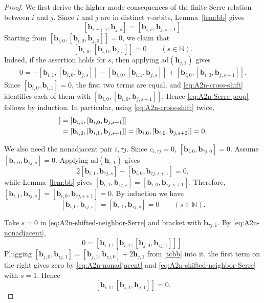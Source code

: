 \documentclass[11pt,reqno]{amsart}
\numberwithin{equation}{section}
\theoremstyle{definition}
\theoremstyle{remark}
\newcommand{\bN}{\mathbb{N}}
\newcommand{\bb}{\mathbf{b}}
\newcommand{\bh}{\mathbf{h}}
\newcommand{\ad}{\mathrm{ad}}
\begin{document}
\begin{proof}
We first derive the higher-mode consequences of the finite Serre relation between $i$ and $j$.
Since $i$ and $j$ are in distinct $\tau$-orbits,
Lemma~\ref{lem:bb} gives
\begin{equation}\label{eq:A2n-cross-shift}
[\bb_{i,r+1},\bb_{j,s}]
=
[\bb_{i,r},\bb_{j,s+1}].
\end{equation}
Starting from $[\bb_{i,0},[\bb_{i,0},\bb_{j,0}]]=0$, we claim that
\begin{equation}\label{eq:A2n-Serre-prop}
[\bb_{i,0},[\bb_{i,0},\bb_{j,s}]]=0
\qquad
(s\in\bN).
\end{equation}
Indeed, if the assertion holds for $s$, then applying
$\ad(\bh_{j,1})$ gives
\begin{align*}
0=
-[\bb_{i,1},[\bb_{i,0},\bb_{j,s}]]
-[\bb_{i,0},[\bb_{i,1},\bb_{j,s}]]+
[\bb_{i,0},[\bb_{i,0},\bb_{j,s+1}]].
\end{align*}
Since $[\bb_{i,0},\bb_{i,1}]=0$, the first two terms are equal, and
\eqref{eq:A2n-cross-shift} identifies each of them with
$[\bb_{i,0},[\bb_{i,0},\bb_{j,s+1}]]$.
Hence \eqref{eq:A2n-Serre-prop} follows by induction.  In particular,
using \eqref{eq:A2n-cross-shift} twice,
\begin{align}
[\bb_{i,1},[\bb_{i,1},\bb_{j,s}]]
&=
[\bb_{i,1},[\bb_{i,0},\bb_{j,s+1}]]
\notag\\
&=
[\bb_{i,0},[\bb_{i,1},\bb_{j,s+1}]]=
[\bb_{i,0},[\bb_{i,0},\bb_{j,s+2}]]
=0.
\label{eq:A2n-shifted-neighbor-Serre}
\end{align}

We also need the nonadjacent pair $i,\tau j$.  Since
$c_{i,\tau j}=0$, $[\bb_{i,0},\bb_{\tau j,0}]=0$. Assume $[\bb_{i,0},\bb_{\tau j,s}]=0$.  Applying
$\ad(\bh_{i,1})$ gives
\begin{equation*}
2[\bb_{i,1},\bb_{\tau j,s}]
-
[\bb_{i,0},\bb_{\tau j,s+1}]
=0,
\end{equation*}
while Lemma~\ref{lem:bb} gives $[\bb_{i,1},\bb_{\tau j,s}]
=
[\bb_{i,0},\bb_{\tau j,s+1}]$. Therefore, $[\bb_{i,1},\bb_{\tau j,s}]
=
[\bb_{i,0},\bb_{\tau j,s+1}]=0$. By induction we have
\begin{equation}\label{eq:A2n-nonadjacent}
[\bb_{i,0},\bb_{\tau j,s}]
=
[\bb_{i,1},\bb_{\tau j,s}]
=0
\qquad
(s\in\bN).
\end{equation}

Take $s=0$ in \eqref{eq:A2n-shifted-neighbor-Serre} and bracket
with $\bb_{\tau j,1}$.  By
\eqref{eq:A2n-nonadjacent},
\begin{equation*}
0
=
[\bb_{i,1},
[\bb_{i,1},
[\bb_{j,0},\bb_{\tau j,1}]]].
\end{equation*}
Plugging 
$
[\bb_{j,0},\bb_{\tau j,1}]
=
[\bb_{j,1},\bb_{\tau j,0}]
+
2\bh_{j,1}$ from \eqref{tcbb} into it,
the first term on the right gives zero by
\eqref{eq:A2n-nonadjacent} and
\eqref{eq:A2n-shifted-neighbor-Serre} with $s=1$.  Hence
\begin{equation}\label{eq:A2n-bi-bi-hj}
[\bb_{i,1},[\bb_{i,1},\bh_{j,1}]]=0.
\end{equation}


\end{proof}
\end{document}

